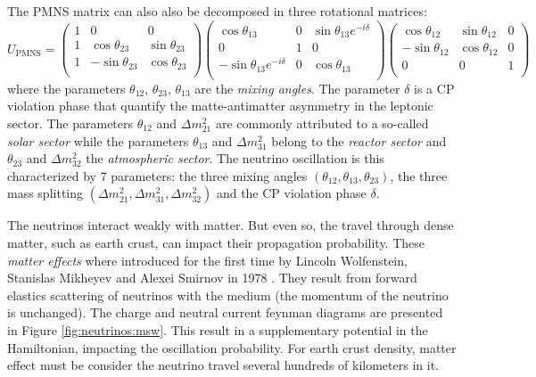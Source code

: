 The PMNS matrix can also also be decomposed in three rotational matrices:
\begin{equation}
  U_{\text{PMNS}} = \begin{pmatrix}
    1 & 0 & 0 \\
    1 & \cos \theta_{23} & \sin \theta_{23} \\
    1 & -\sin \theta_{23} & \cos \theta_{23} \\
  \end{pmatrix} \begin{pmatrix}
    \cos \theta_{13} & 0 & \sin \theta_{13} e^{-i\delta}\\
    0 & 1 & 0 \\
    -\sin \theta_{13} e^{-i\delta} & 0 &  \cos \theta_{13} \\
  \end{pmatrix} \begin{pmatrix}
    \cos \theta_{12} & \sin \theta_{12} & 0 \\
    -\sin \theta_{12} & \cos \theta_{12} & 0 \\
    0 & 0 & 1 \\
  \end{pmatrix}
\end{equation}
where the parameters $\theta_{12}$, $\theta_{23}$, $\theta_{13}$ are the \textit{mixing angles}. The parameter $\delta$ is a CP violation phase that quantify the matte-antimatter asymmetry in the leptonic sector. The parameters $\theta_{12}$ and $\Delta m^2_{21}$ are commonly attributed to a so-called \textit{solar sector} while the parameters $\theta_{13}$ and $\Delta m^2_{31}$ belong to the \textit{reactor sector} and $\theta_{23}$ and $\Delta m^2_{32}$ the \textit{atmospheric sector}. The neutrino oscillation is this characterized by 7 parameters: the three mixing angles $(\theta_{12}, \theta_{13}, \theta_{23})$, the three mass splitting $(\Delta m^2_{21}, \Delta m^2_{31}, \Delta m^2_{32})$ and the CP violation phase $\delta$.

The neutrinos interact weakly with matter. But even so, the travel through dense matter, such as earth crust, can impact their propagation probability. These \textit{matter effects} where introduced for the first time by Lincoln Wolfenstein, Stanislas Mikheyev and Alexei Smirnov in 1978 \cite{wolfenstein_neutrino_1978}. They result from forward elastics scattering of neutrinos with the medium (the momentum of the neutrino is unchanged). The charge and neutral current feynman diagrams are presented in Figure \ref{fig:neutrinos:msw}. This result in a supplementary potential in the Hamiltonian, impacting the oscillation probability. For earth crust density, matter effect must be consider the neutrino travel several hundreds of kilometers in it.


